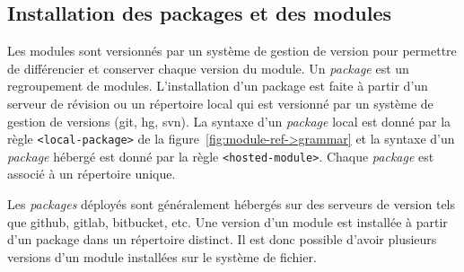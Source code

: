 \subsection{Installation des packages et des modules}
%
Les modules sont versionnés par un système de gestion de version
pour permettre de différencier et conserver chaque version du module.
Un \textit{package} est un regroupement de modules.  L'installation d'un
package est faite à partir d'un serveur de révision ou un répertoire local qui
est versionné par un système de gestion de versions (git, hg, svn).  La syntaxe
d'un \textit{package} local est donné par la règle \texttt{<local-package>} de
la figure~\ref{fig:module-ref->grammar} et la syntaxe d'un \textit{package}
hébergé est donné par la règle \texttt{<hosted-module>}.  Chaque
\textit{package} est associé à un répertoire unique.







Les \textit{packages} déployés sont généralement hébergés sur des serveurs de
version tels que github, gitlab, bitbucket, etc. Une version d'un module est
installée à partir d'un package dans un répertoire distinct.
Il est donc possible d'avoir plusieurs versions d'un module installées
sur le système de fichier.

